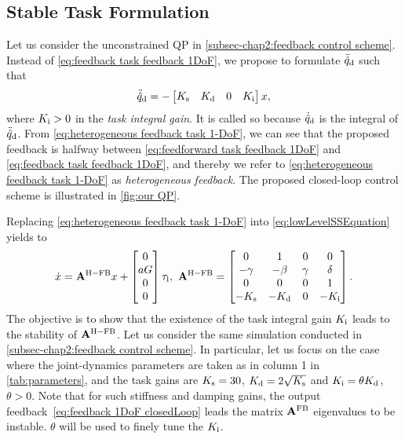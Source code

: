 \subsection{Stable Task Formulation}\label{subsec-chap2:stable feedback task formulation}
Let us consider the unconstrained QP in \cref{subsec-chap2:feedback control scheme}. Instead of \cref{eq:feedback task feedback 1DoF}, we propose to formulate $\ddot{\hat{q}}_{\rm d}$ such that 
\begin{equation}\label{eq:heterogeneous feedback task 1-DoF}
	\ddot{\hat{q}}_{\rm d} = - \begin{bmatrix}
		K_{\rm s} & K_{\rm d} & 0 & K_{\rm i}
	\end{bmatrix}x,
\end{equation} 
where $K_{\rm i}>0$ in the \emph{task integral gain}. It is called so because $\dot{\hat{q}}_{\rm d}$ is the integral of   $\ddot{\hat{q}}_{\rm d}$. From \cref{eq:heterogeneous feedback task 1-DoF}, we can see that the proposed feedback is halfway between \cref{eq:feedforward task feedback 1DoF} and \cref{eq:feedback task feedback 1DoF}, and thereby we refer to \cref{eq:heterogeneous feedback task 1-DoF} as  \emph{heterogeneous feedback}. The proposed closed-loop control scheme is illustrated in \cref{fig:our QP}.

Replacing \cref{eq:heterogeneous feedback task 1-DoF} into \cref{eq:lowLevelSSEquation} yields to 
\begin{equation}\label{eq:heterogeneous feedback 1DoF closedLoop}
	\dot{x} = \mathbf{A}^{\rm H-FB}x + \begin{bmatrix}
		0 \\ aG \\ 0 \\ 0
	\end{bmatrix}\tau_{\rm l}, \ \mathbf{A}^{\rm H-FB} = 
	\begin{bmatrix}
		0 & 1 & 0 & 0 \\
		-\gamma & -\beta & \gamma & \delta \\ 
		0 & 0 & 0 & 1 \\ 
		-K_{\rm s} & -K_{\rm d} & 	0 & -K_{\rm i} 
	\end{bmatrix}.
\end{equation}
The objective is to show that the existence of the task integral gain $K_{\rm i}$ leads to the stability of $\mathbf{A}^{\rm H-FB}$. Let us consider the same simulation conducted in \cref{subsec-chap2:feedback control scheme}.  In particular, let us focus on the case where the joint-dynamics parameters are taken as in column 1 in \cref{tab:parameters}, and  the task gains are  $K_{\rm s} = 30$, $K_{\rm d}= 2\sqrt{K_{\rm s}}$ and $K_{\rm i}= \theta K_{\rm d}$, $\theta>0$. Note that for such stiffness and damping gains, the output feedback~\eqref{eq:feedback 1DoF closedLoop} leads the matrix $\mathbf{A}^{\rm FB}$ eigenvalues to be instable. 
$\theta$ will be used to finely tune the $K_{\rm i}$. 

